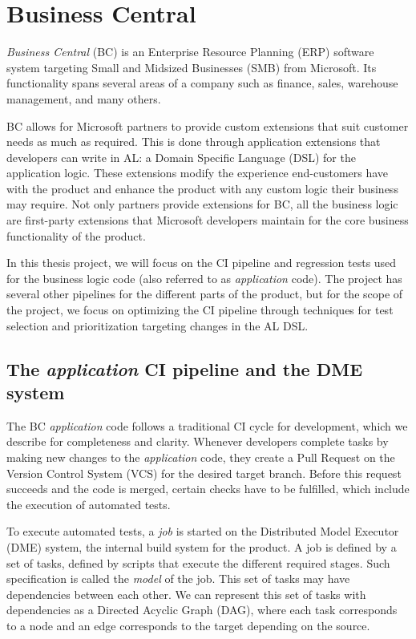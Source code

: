 \section{Business Central}

\emph{Business Central} (BC) is an Enterprise Resource Planning (ERP) software 
system targeting Small and Midsized Businesses (SMB) from Microsoft. Its functionality
spans several areas of a company such as finance, sales, warehouse management, and
many others.

BC allows for Microsoft partners to provide custom extensions that suit customer
needs as much as required. This is done through application extensions that developers
can write in AL: a Domain Specific Language (DSL) for the application logic. 
These extensions modify the experience end-customers have with the product and 
enhance the product with any custom logic their business may require.
Not only partners provide extensions for BC, all the business logic
are first-party extensions that Microsoft developers maintain for the core business 
functionality of the product.

In this thesis project, we will focus on the CI pipeline and regression tests
used for the business logic code (also referred to as \emph{application} code).
The project has several other pipelines for the different parts of the product,
but for the scope of the project, we focus on optimizing the CI pipeline through
techniques for test selection and prioritization targeting changes in the AL DSL.

\subsection{The \emph{application} CI pipeline and the DME system}\label{s:bc-ci-dme}

The BC \emph{application} code follows a traditional CI cycle for development, which we describe 
for completeness and clarity. Whenever developers complete tasks by making new 
changes to the \emph{application} code, they create a Pull Request on the 
Version Control System (VCS) for the desired target branch. Before this request
succeeds and the code is merged, certain checks have to be fulfilled, which 
include the execution of automated tests.

To execute automated tests, a \emph{job} is started on the Distributed Model Executor (DME)
system, the internal build system for the product.  A job is defined by a set of 
tasks, defined by scripts that execute the different required stages. Such specification is
called the \emph{model} of the job. This set of tasks may have dependencies between each other. 
We can represent this set of tasks with dependencies as a Directed Acyclic Graph (DAG), where
each task corresponds to a node and an edge corresponds to the target depending on the source.


